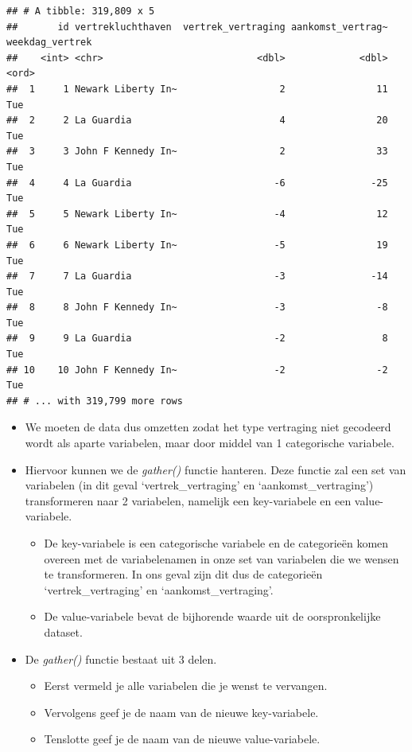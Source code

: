 \documentclass[]{tufte-book}
\providecommand{\tightlist}{%
  \setlength{\itemsep}{0pt}\setlength{\parskip}{0pt}}
\begin{document}
\begin{verbatim}
## # A tibble: 319,809 x 5
##       id vertrekluchthaven  vertrek_vertraging aankomst_vertrag~ weekdag_vertrek
##    <int> <chr>                           <dbl>             <dbl> <ord>          
##  1     1 Newark Liberty In~                  2                11 Tue            
##  2     2 La Guardia                          4                20 Tue            
##  3     3 John F Kennedy In~                  2                33 Tue            
##  4     4 La Guardia                         -6               -25 Tue            
##  5     5 Newark Liberty In~                 -4                12 Tue            
##  6     6 Newark Liberty In~                 -5                19 Tue            
##  7     7 La Guardia                         -3               -14 Tue            
##  8     8 John F Kennedy In~                 -3                -8 Tue            
##  9     9 La Guardia                         -2                 8 Tue            
## 10    10 John F Kennedy In~                 -2                -2 Tue            
## # ... with 319,799 more rows
\end{verbatim}

\begin{itemize}
\tightlist
\item
  We moeten de data dus omzetten zodat het type vertraging niet gecodeerd wordt als aparte variabelen, maar door middel van 1 categorische variabele.
\item
  Hiervoor kunnen we de \emph{gather()} functie hanteren. Deze functie zal een set van variabelen (in dit geval `vertrek\_vertraging' en `aankomst\_vertraging') transformeren naar 2 variabelen, namelijk een key-variabele en een value-variabele.

  \begin{itemize}
  \tightlist
  \item
    De key-variabele is een categorische variabele en de categorieën komen overeen met de variabelenamen in onze set van variabelen die we wensen te transformeren. In ons geval zijn dit dus de categorieën `vertrek\_vertraging' en `aankomst\_vertraging'.
  \item
    De value-variabele bevat de bijhorende waarde uit de oorspronkelijke dataset.
  \end{itemize}
\item
  De \emph{gather()} functie bestaat uit 3 delen.

  \begin{itemize}
  \tightlist
  \item
    Eerst vermeld je alle variabelen die je wenst te vervangen.
  \item
    Vervolgens geef je de naam van de nieuwe key-variabele.
  \item
    Tenslotte geef je de naam van de nieuwe value-variabele.
  \end{itemize}
\end{itemize}
\end{document}
